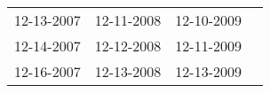 \begin{supertabular}{llll}
 12-13-2007 &  12-11-2008 &  12-10-2009 \\
 12-14-2007 &  12-12-2008 &  12-11-2009 \\
 12-16-2007 &  12-13-2008 &  12-13-2009 \\
\end{supertabular}
